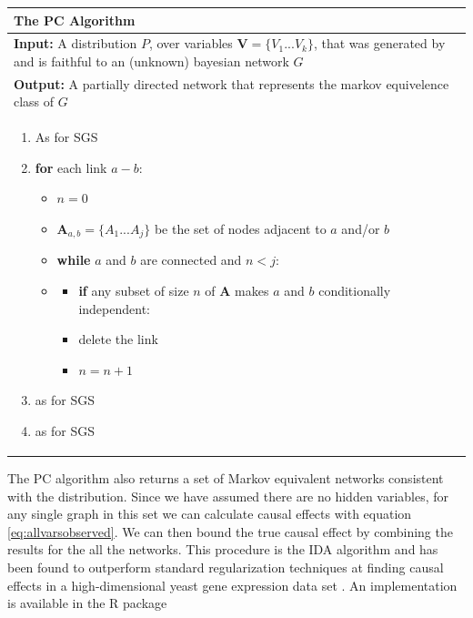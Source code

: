 \documentclass[11pt,a4paper,oneside]{book}
\begin{document}
\begin{table}[H]
 \begin{tabularx}{\textwidth}{X}
 \hline
\rule{0pt}{2.5ex} 
 \textbf{The PC Algorithm}\\
 \hline
 \rule{0pt}{2.5ex}
\textbf{Input:} A distribution $P$, over variables $\boldsymbol{V} = \{V_{1}...V_{k}\}$, that was generated by and is faithful to an (unknown) bayesian network $G$\\
\textbf{Output:} A partially directed network that represents the markov equivelence class of $G$\\
 \begin{enumerate}[itemsep=8pt]
  \item As for SGS
  \item \textbf{for} each link $a-b$:
  \begin{itemize}[label={}]
   \item $n = 0$
   \item $\boldsymbol{A}_{a,b} = \{A_{1}...A_{j}\}$ be the set of nodes adjacent to $a$ and/or $b$
   \item \textbf{while} $a$ and $b$ are connected and $n < j$:
   \item 
    	\begin{itemize}[label={}]
    	\item \textbf{if} any subset of size $n$ of $\boldsymbol{A}$ makes $a$ and $b$ conditionally independent:
    	\item \begin{itemize}[label={}]
    			delete the link
    		  \end{itemize}
    	
    	\item $n = n+1$
    	\end{itemize}
  \end{itemize}   
  \item as for SGS
  \item as for SGS
\end{enumerate}\\
 \hline
\end{tabularx}
\end{table}

The PC algorithm also returns a set of Markov equivalent networks consistent with the distribution. Since we have assumed there are no hidden variables, for any single graph in this set we can calculate causal effects with equation \ref{eq:allvarsobserved}. We can then bound the true causal effect by combining the results for the all the networks. This procedure is the IDA algorithm \cite{Maathuis2009} and has been found to outperform standard regularization techniques at finding causal effects in a high-dimensional yeast gene expression data set \cite{Maathuis2010}. An implementation is available in the R package \cite{Kalisch2012} 
\end{document}
